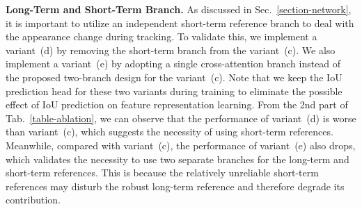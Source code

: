 \noindent\textbf{Long-Term and Short-Term Branch.} As discussed in Sec.~\ref{section-network}, it is important to utilize an independent short-term reference branch to deal with the appearance change during tracking. To validate this, we implement a variant~(d) by removing the short-term branch from the variant~(c). We also implement a variant~(e) by adopting a single cross-attention branch instead of the proposed two-branch design for the variant~(c). Note that we keep the IoU prediction head for these two variants during training to eliminate the possible effect of IoU prediction on feature representation learning. From the 2nd part of Tab.~\ref{table-ablation}, we can observe that the performance of variant~(d) is worse than variant~(c), which suggests the necessity of using short-term references. Meanwhile, compared with variant~(c), the performance of variant~(e) also drops, which validates the necessity to use two separate branches for the long-term and short-term references. This is because the relatively unreliable short-term references may disturb the robust long-term reference and therefore degrade its contribution.

